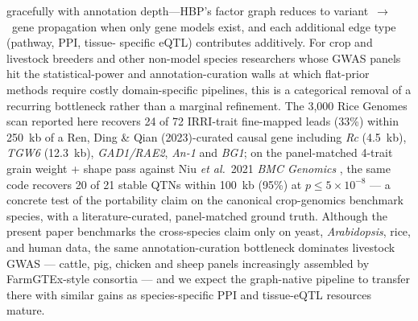 gracefully with annotation depth---HBP's factor graph reduces to
variant~$\rightarrow$~gene propagation when only gene models
exist, and each additional edge type (pathway, PPI, tissue-
specific eQTL) contributes additively. For crop and livestock breeders and other non-model species
researchers whose GWAS panels hit the
statistical-power and annotation-curation walls at which
flat-prior methods require costly domain-specific pipelines,
this is a categorical removal of a recurring bottleneck rather
than a marginal refinement. The 3{,}000 Rice Genomes scan
reported here recovers 24 of 72 IRRI-trait fine-mapped leads
(33\%) within 250~kb of a Ren, Ding \& Qian (2023)\cite{ren2023rice}-curated
causal gene including \emph{Rc} (4.5~kb), \emph{TGW6} (12.3~kb),
\emph{GAD1/RAE2}, \emph{An-1} and \emph{BG1}; on the
panel-matched 4-trait grain weight + shape pass against
Niu \emph{et al.}\ 2021 \emph{BMC Genomics} \cite{niu2021grain},
the same code recovers 20 of 21 stable QTNs within 100~kb
(95\%) at $p\leq5\times10^{-8}$ --- a concrete
test of the portability claim on the canonical crop-genomics
benchmark species, with a literature-curated, panel-matched
ground truth. Although the present paper benchmarks the
cross-species claim only on yeast, \emph{Arabidopsis}, rice, and
human data, the same annotation-curation bottleneck dominates
livestock GWAS --- cattle, pig, chicken and sheep panels
increasingly assembled by FarmGTEx-style consortia --- and we
expect the graph-native pipeline to transfer there with similar
gains as species-specific PPI and tissue-eQTL resources mature.

